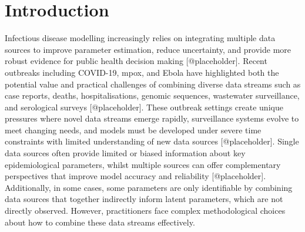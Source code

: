 \documentclass{article}
\begin{document}
\section{Introduction}

Infectious disease modelling increasingly relies on integrating multiple data sources to improve parameter estimation, reduce uncertainty, and provide more robust evidence for public health decision making [@placeholder].
Recent outbreaks including COVID-19, mpox, and Ebola have highlighted both the potential value and practical challenges of combining diverse data streams such as case reports, deaths, hospitalisations, genomic sequences, wastewater surveillance, and serological surveys [@placeholder].
These outbreak settings create unique pressures where novel data streams emerge rapidly, surveillance systems evolve to meet changing needs, and models must be developed under severe time constraints with limited understanding of new data sources [@placeholder].
Single data sources often provide limited or biased information about key epidemiological parameters, whilst multiple sources can offer complementary perspectives that improve model accuracy and reliability [@placeholder].
Additionally, in some cases, some parameters are only identifiable by combining data sources that together indirectly inform latent parameters, which are not directly observed.
However, practitioners face complex methodological choices about how to combine these data streams effectively.
\end{document}
